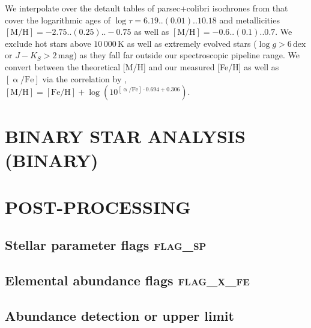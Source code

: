 \documentclass[
  journal=pasa,
  manuscript=research-paper, %
  year=2023,
  volume=37
]{cup-journal}
\begin{document}
We interpolate over the detault tables of {\sc parsec+colibri} isochrones \citep{Bressan2012, Marigo2017} from that cover the logarithmic ages of $\log \tau = 6.19..(0.01)..10.18$ and metallicities $\mathrm{[M/H]} = -2.75..(0.25)..-0.75$ as well as $\mathrm{[M/H]} = -0.6..(0.1)..0.7$. We exclude hot stars above $10\,000\,\mathrm{K}$ as well as extremely evolved stars ($\log g > 6\,\mathrm{dex}$ or $J - K_S > 2\,\mathrm{mag}$) as they fall far outside our spectroscopic pipeline range. We convert between the theoretical [M/H] and our measured [Fe/H] as well as $\mathrm{[\upalpha/Fe]}$ via the correlation by \citet{Salaris2006}, $\mathrm{[M/H]} = \mathrm{[Fe/H]} + \log\left(10^{\mathrm{[\upalpha/Fe]} \cdot 0.694 + 0.306} \right)$.

\section{BINARY STAR ANALYSIS (BINARY)}
\label{sec:binary_analysis}

\newpage
\section{POST-PROCESSING}
\label{sec:post_processing}

\subsection{Stellar parameter flags \textsc{flag\_sp}}
\label{sec:flag_sp}


\subsection{Elemental abundance flags \textsc{flag\_x\_fe}}
\label{sec:flag_x_fe}


\subsection{Abundance detection or upper limit}
\label{sec:abundance_detection_or_upper_limit}
\end{document}
